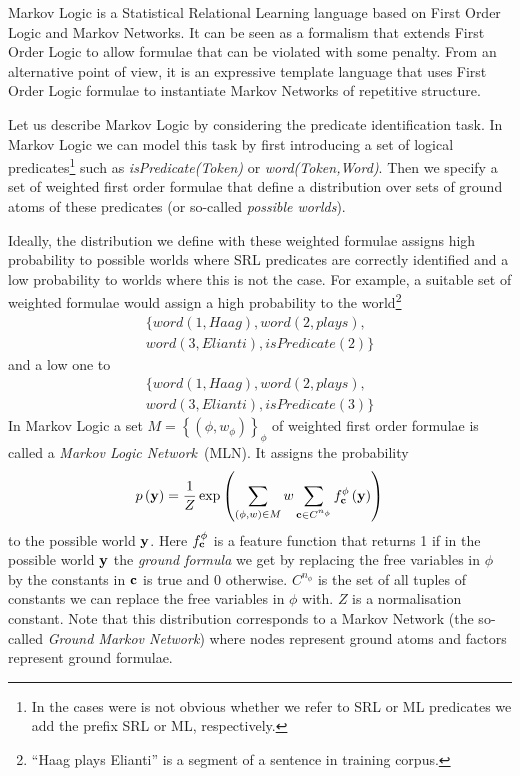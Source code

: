 Markov Logic \citep[ML, ][]{richardson05markov} is a Statistical Relational Learning language based on First Order Logic and Markov Networks. It can be seen as a formalism that extends First Order Logic to allow formulae that can be violated
with some penalty. From an alternative point of view, it is an expressive
template language that uses First Order Logic formulae to instantiate
Markov Networks of repetitive structure. 

Let us describe Markov Logic by considering the predicate identification task. In Markov Logic we can model this task by first introducing a set of logical predicates\footnote{In the cases were is not obvious whether we refer to SRL or ML predicates we add the prefix SRL or ML, respectively.} such as \emph{isPredicate(Token)} or \emph{word(Token,Word)}. Then we specify a set of weighted first order formulae that define a distribution over sets of ground atoms of these predicates (or so-called \emph{possible worlds}). 

Ideally, the distribution we define with these weighted formulae assigns high probability to possible worlds where SRL predicates are correctly identified and a low probability to worlds where this is not the case. For example, a suitable set of weighted formulae would assign a high probability to the world\footnote{``Haag plays Elianti'' is a segment of a sentence in training corpus.}
\begin{eqnarray*}
 &\{ word\left(1,Haag\right),word(2,plays),\\
 & word(3,Elianti),isPredicate(2) \}& \end{eqnarray*}
and a low one to
\begin{eqnarray*}
& \{ word\left(1,Haag\right),word(2,plays),\\
 & word(3,Elianti),isPredicate(3) \} &\end{eqnarray*}
In Markov Logic a set $M=\left\{ \left(\phi,w_{\phi}\right)\right\} _{\phi}$ of weighted first order formulae is called a \emph{Markov Logic Network}~(MLN). It assigns the probability
\begin{equation}
p\left(\mathbf{y}\right)=\frac{1}{Z}\exp\left(
\sum_{\left(\phi,w\right)\in M} w
\sum_{\mathbf{c}\in C^{n_{\phi}}}f_{\mathbf{c}}^{\phi}\left(\mathbf{y}\right)
\right)
\label{eq:prob}
\end{equation}
to the possible world $\mathbf{y}$. Here $f_{\mathbf{c}}^{\phi}$ is a feature
function that returns 1 if in the possible world $\mathbf{y}$ the \emph{ground
formula} we get by replacing the free variables in $\phi$ by the constants
in $\mathbf{c}$ is true and 0 otherwise. $C^{n_{\phi}}$ is the set
of all tuples of constants we can replace the free variables in $\phi$
with. $Z$ is a normalisation constant. Note that this distribution corresponds to a Markov Network (the so-called \emph{Ground Markov Network}) where nodes represent ground atoms and factors represent ground formulae.

